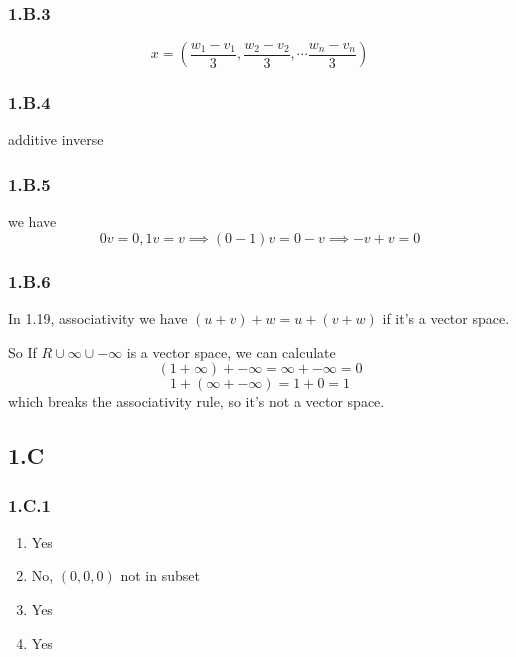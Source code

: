 \subsubsection*{1.B.3}
\begin{equation*}
    x = (\frac{w_1 - v_1}{3}, \frac{w_2-v_2}{3}, \cdots \frac{w_n-v_n}{3})
\end{equation*}

\subsubsection*{1.B.4}
additive inverse

\subsubsection*{1.B.5}
we have
\begin{equation*}
    0v = 0, 1v = v \implies    (0-1)v = 0 - v \implies -v + v = 0
\end{equation*}

\subsubsection*{1.B.6}
In 1.19, associativity we have $(u+v)+w = u+(v+w)$ if it's a vector space.

So If $R \cup \infty \cup -\infty$ is a vector space, we can calculate
    \[ (1 + \infty) + -\infty = \infty + -\infty = 0 \]
    \[1 + (\infty + -\infty) = 1 + 0 = 1\]
which breaks the associativity rule, so it's not a vector space.


\subsection*{1.C}

\subsubsection*{1.C.1}
\begin{enumerate}[label=(\alph*)]
\item Yes
\item No, $(0, 0, 0)$ not in subset
\item Yes
\item Yes
\end{enumerate}

\newpage
